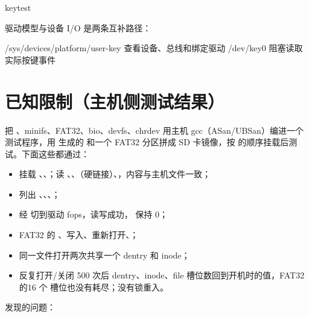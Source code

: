 \begin{shcode}
keytest
\end{shcode}

驱动模型与设备 I/O 是两条互补路径：

\begin{txtcode}
/sys/devices/platform/user-key  查看设备、总线和绑定驱动
/dev/key0                       阻塞读取实际按键事件
\end{txtcode}

\section{已知限制（主机侧测试结果）}

把 、minifs、FAT32、bio、devfs、chrdev 用主机 gcc（ASan/UBSan）编进一个测试程序，用  生成的  和一个 FAT32 分区拼成 SD 卡镜像，按  的顺序挂载后测试。下面这些都通过：

\begin{itemize}
  \item 挂载 \file{/}、、；读 、、（硬链接）、，内容与主机文件一致；
  \item {} 列出 \file{/}、、、；
  \item {} 经  切到驱动 fops，读写成功， 保持 0；
  \item FAT32 的 、写入、重新打开、；
  \item 同一文件打开两次共享一个 dentry 和 inode；
  \item 反复打开/关闭 500 次后 dentry、inode、file 槽位数回到开机时的值，FAT32 的16 个  槽位也没有耗尽；没有锁重入。
\end{itemize}

发现的问题：

